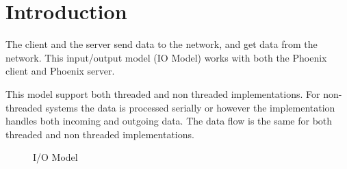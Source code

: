 \section{Introduction}
The client and the server send data to the network, and get
data from the network.
This \mbox{input/output} model (IO Model) works with
both the Phoenix client and Phoenix server.

This model support both threaded and non threaded
implementations.
For non-threaded systems the data is processed serially
or however the implementation handles both incoming
and outgoing data.
The data flow is the same for both threaded and non threaded
implementations.

\begin{figure}
  \centering
  \caption{I/O Model}
  \label{fig:IOModel}
  
\end{figure}

